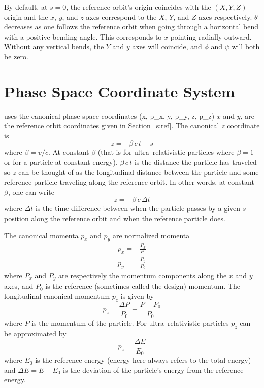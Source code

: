 By default, at $s = 0$,
the reference orbit's origin coincides with the
$(X, Y, Z)$ origin and the $x$, $y$, and $z$ axes
correspond to the $X$, $Y$, and $Z$ axes respectively. $\theta$
decreases as one follows the reference orbit when going through a
horizontal bend with a positive bending angle. This corresponds to $x$
pointing radially outward. Without any vertical bends, the $Y$ and $y$
axes will coincide, and $\phi$ and $\psi$ will both be zero.

\vfill

\section{Phase Space Coordinate System}
\label{s:phase_space_coords}

\bmad uses the canonical phase space coordinates 
\Begineq
  (x, p_x, y, p_y, z, p_z)
\Endeq
$x$ and $y$, are the reference orbit coordinates given in
Section~\ref{s:ref}. The canonical $z$ coordinate is
\begin{equation}
  z = - \beta \, c \, t - s
\end{equation}
where $\beta = v/c$. At constant $\beta$ (that is for
ultra--relativistic particles where $\beta = 1$ or for a particle at
constant energy), $\beta \, c \, t$ is the distance the particle has
traveled so $z$ can be thought of as the longitudinal distance between
the particle and some reference particle traveling along the reference
orbit. In other words, at constant $\beta$, one can write
\begin{equation}
  z = - \beta \, c \, \Delta t
\end{equation}
where $\Delta t$ is the time difference between when the particle
passes by a given $s$ position along the reference orbit and when the
reference particle does.

The canonical momenta $p_x$ and $p_y$ are normalized momenta
\begin{align}
  p_x = &\frac{P_x}{P_0} \\
  p_y = &\frac{P_y}{P_0}
\end{align}
where $P_x$ and $P_y$ are respectively the momentum components along
the $x$ and $y$ axes, and $P_0$ is the reference (sometimes called the
design) momentum. The longitudinal canonical momentum $p_z$ is given
by
\begin{equation}
  p_z = \frac{\Delta P}{P_0} \equiv \frac{P - P_0}{P_0}
\end{equation}
where $P$ is the momentum of the particle. For ultra--relativistic particles
$p_z$ can be approximated by
\begin{equation}
  p_z = \frac{\Delta E}{E_0}
\end{equation}
where $E_0$ is the reference energy (energy here always refers to the
total energy) and $\Delta E = E - E_0$ is the deviation of the
particle's energy from the reference energy. 

